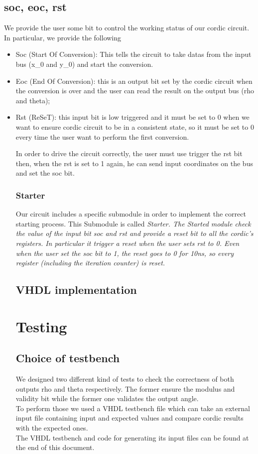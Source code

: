 \documentclass[12pt,a4paper]{report}
\begin{document}
\section{soc, eoc, rst}
We provide the user some bit to control the working status of our cordic circuit. In particular, we provide the following
\begin{itemize}
	\item{Soc (Start Of Conversion)}: This tells the circuit to take datas from the input bus (x_{0} and y_{0}) and start the conversion.
	\item{Eoc (End Of Conversion)}: this is an output bit set by the cordic circuit when the conversion is over and the user can read the result on the output bus (rho and theta);
	\item{Rst (ReSeT)}: this input bit is low triggered and it must be set to 0 when we want to ensure cordic circuit to be in a consistent state, so it must be set to 0 every time the user want to perform the first conversion.

In order to drive the circuit correctly, the user must use trigger the rst bit then, when the rst is set to 1 again, he can send input coordinates on the bus and set the soc bit.

\subsection{Starter}
Our circuit includes a specific submodule in order to implement the correct starting process. This Submodule is called \em{Starter}. The Started module check the value of the input bit soc and rst and provide a reset bit to all the cordic's registers. In particular it trigger a reset when the user sets rst to 0. Even when the user set the soc bit to 1, the reset goes to 0 for 10ns, so every register (including the iteration counter) is reset.


\section{VHDL implementation}




\chapter{Testing}

\section{Choice of testbench}
We designed two different kind of tests to check the correctness of both outputs rho and theta respectively.
The former ensure the modulus and validity bit while the former one validates the output angle.\\
To perform those we used a VHDL testbench file which can take an external input file containing input and expected values and compare cordic results with the expected ones.\\
The VHDL testbench and code for generating its input files can be found at the end of this document.


\end{itemize}
\end{document}
